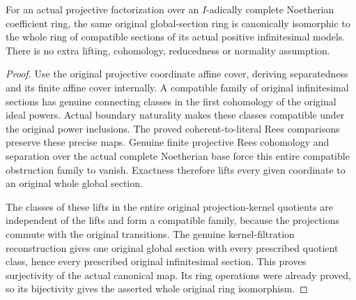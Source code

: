 \begin{theorem}
\label{thm:fibre-projective-formal-sections}
\leanok
For an actual projective factorization over an $I$-adically complete
Noetherian coefficient ring, the same original global-section ring is
canonically isomorphic to the whole ring of compatible sections of its
actual positive infinitesimal models. There is no extra lifting,
cohomology, reducedness or normality assumption.
\end{theorem}
\begin{proof}
Use the original projective coordinate affine cover, deriving
separatedness and its finite affine cover internally. A compatible
family of original infinitesimal sections has genuine connecting
classes in the first cohomology of the original ideal powers. Actual
boundary naturality makes these classes compatible under the original
power inclusions. The proved coherent-to-literal Rees comparisons
preserve these precise maps. Genuine finite projective Rees cohomology
and separation over the actual complete Noetherian base force this
entire compatible obstruction family to vanish. Exactness therefore
lifts every given coordinate to an original whole global section.

The classes of these lifts in the entire original projection-kernel
quotients are independent of the lifts and form a compatible family,
because the projections commute with the original transitions. The
genuine kernel-filtration reconstruction gives one original global
section with every prescribed quotient class, hence every prescribed
original infinitesimal section. This proves surjectivity of the actual
canonical map. Its ring operations were already proved, so its
bijectivity gives the asserted whole original ring isomorphism.
\end{proof}

